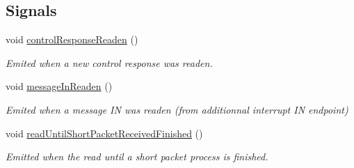 \subsection*{Signals}
\begin{DoxyCompactItemize}
\item 
\hypertarget{classmdt_usb_port_thread_ab8ac3a6e1b571215be86f9dfd8c48b2b}{
void \hyperlink{classmdt_usb_port_thread_ab8ac3a6e1b571215be86f9dfd8c48b2b}{controlResponseReaden} ()}
\label{classmdt_usb_port_thread_ab8ac3a6e1b571215be86f9dfd8c48b2b}

\begin{DoxyCompactList}\small\item\em Emited when a new control response was readen. \end{DoxyCompactList}\item 
\hypertarget{classmdt_usb_port_thread_a850204a909f0bbe41c5e995ebe3670d8}{
void \hyperlink{classmdt_usb_port_thread_a850204a909f0bbe41c5e995ebe3670d8}{messageInReaden} ()}
\label{classmdt_usb_port_thread_a850204a909f0bbe41c5e995ebe3670d8}

\begin{DoxyCompactList}\small\item\em Emited when a message IN was readen (from additionnal interrupt IN endpoint) \end{DoxyCompactList}\item 
\hypertarget{classmdt_usb_port_thread_a54e65bed60200cd2150b5a7b063c723e}{
void \hyperlink{classmdt_usb_port_thread_a54e65bed60200cd2150b5a7b063c723e}{readUntilShortPacketReceivedFinished} ()}
\label{classmdt_usb_port_thread_a54e65bed60200cd2150b5a7b063c723e}

\begin{DoxyCompactList}\small\item\em Emitted when the read until a short packet process is finished. \end{DoxyCompactList}\end{DoxyCompactItemize}
